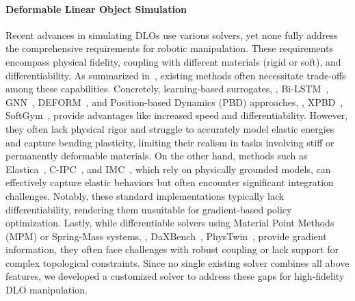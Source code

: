\paragraph{Deformable Linear Object Simulation} Recent advances in simulating DLOs use various solvers, yet none fully address the comprehensive requirements for robotic manipulation. These requirements encompass physical fidelity, coupling with different materials (rigid or soft), and differentiability. As summarized in~, existing methods often necessitate trade-offs among these capabilities. Concretely, learning-based surrogates, \eg, Bi-LSTM~\citep{yan2020self}, GNN~\citep{wang2022offline}, DEFORM~\citep{chendifferentiable}, and Position-based Dynamics (PBD) approaches, \eg, XPBD~\citep{liu2023robotic}, SoftGym~\citep{lin2021softgym}, provide advantages like increased speed and differentiability. However, they often lack physical rigor and struggle to accurately model elastic energies and capture bending plasticity, limiting their realism in tasks involving stiff or permanently deformable materials. On the other hand, methods such as Elastica~\citep{naughton2021elastica}, C-IPC~\citep{li2021codimensional}, and IMC~\cite{tong2023fully}, which rely on physically grounded models, can effectively capture elastic behaviors but often encounter significant integration challenges. Notably, these standard implementations typically lack differentiability, rendering them unsuitable for gradient-based policy optimization.  Lastly, while differentiable solvers using Material Point Methods (MPM) or Spring-Mass systems, \eg, DaXBench~\cite{chen2023daxbench}, PhysTwin~\cite{jiang2025phystwin}, provide gradient information, they often face challenges with robust coupling or lack support for complex topological constraints. Since no single existing solver combines all above features, we developed a customized solver to address these gaps for high-fidelity DLO manipulation.

